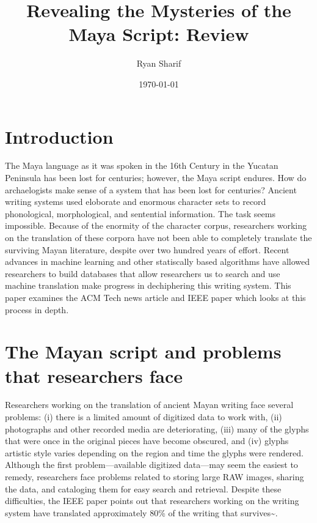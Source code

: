 \documentclass[a4paper,twoside,twocolumn]{article}
\author{Ryan Sharif}
\date{\today}
\title{Revealing the Mysteries of the Maya Script: Review}
\begin{document}
\maketitle

\section{Introduction}
\label{sec-1}
The Maya language as it was spoken  in the 16th Century in the Yucatan
Peninsula  has  been lost  for  centuries;  however, the  Maya  script
endures. How  do archaelogists make  sense of  a system that  has been
lost  for  centuries?  Ancient  writing  systems  used  eloborate  and
enormous  character sets  to record  phonological, morphological,  and
sentential information.   The task  seems impossible.  Because  of the
enormity  of   the  character  corpus,  researchers   working  on  the
translation  of  these  corpora  have  not  been  able  to  completely
translate  the surviving  Mayan literature,  despite over  two hundred
years  of  effort\cite{macri_new_2009}.  Recent  advances  in  machine
learning  and   other  statiscally   based  algorithms   have  allowed
researchers to build databases that allow researchers us to search and
use  machine translation  make progress  in dechiphering  this writing
system.\cite{hu_multimedia_2015} This paper examines the ACM Tech news
article     \cite{bourquenoud_revealing_2015}    and     IEEE    paper
\cite{hu_multimedia_2015} which looks at this process in depth.

\section{The Mayan script and problems that researchers face}
\label{sec-2}
Researchers working on  the translation of ancient  Mayan writing face
several problems: (i)  there is a limited amount of  digitized data to
work   with,   (ii)  photographs   and   other   recorded  media   are
deteriorating, (iii) many of the glyphs that were once in the original
pieces have  become obscured,  and (iv)  glyphs artistic  style varies
depending on  the region and  time the glyphs were  rendered. Although
the first problem---available digitized data---may seem the easiest to
remedy, researchers face problems related to storing large RAW images,
sharing the data,  and cataloging them for easy  search and retrieval.
Despite these difficulties, the IEEE paper points out that researchers
working on the writing system have translated approximately 80\% of the
writing that survives\textasciitilde{}\cite{kettunen_introduction_2008}.
\end{document}
